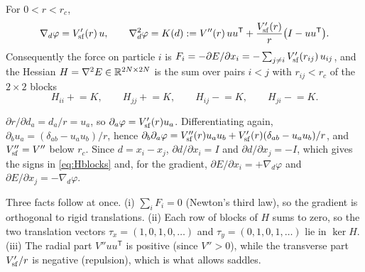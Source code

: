 \begin{proposition}\label{prop:grad-hess}
For $0<r<r_c$,
\begin{equation}\label{eq:pairgrad}
\nabla_d\varphi=V_{\rm sf}'(r)\,u,\qquad
\nabla_d^2\varphi=K(d):=V''(r)\,uu^{\mathsf T}+\frac{V_{\rm sf}'(r)}{r}\bigl(I-uu^{\mathsf T}\bigr).
\end{equation}
Consequently the force on particle $i$ is $F_i=-\partial E/\partial x_i=-\sum_{j\ne i}V_{\rm sf}'(r_{ij})\,u_{ij}$, and
the Hessian $H=\nabla^2E\in\mathbb{R}^{2N\times2N}$ is the sum over pairs $i<j$ with $r_{ij}<r_c$ of the $2\times2$ blocks
\begin{equation}\label{eq:Hblocks}
H_{ii}\mathrel{+}=K,\qquad H_{jj}\mathrel{+}=K,\qquad H_{ij}\mathrel{-}=K,\qquad H_{ji}\mathrel{-}=K .
\end{equation}
\end{proposition}
\begin{humanproof}
$\partial r/\partial d_a=d_a/r=u_a$, so $\partial_a\varphi=V_{\rm sf}'(r)u_a$. Differentiating again,
$\partial_bu_a=(\delta_{ab}-u_au_b)/r$, hence
$\partial_b\partial_a\varphi=V_{\rm sf}''(r)u_au_b+V_{\rm sf}'(r)(\delta_{ab}-u_au_b)/r$, and $V_{\rm sf}''=V''$ below
$r_c$. Since $d=x_i-x_j$, $\partial d/\partial x_i=I$ and $\partial d/\partial x_j=-I$, which gives the signs in
\eqref{eq:Hblocks} and, for the gradient, $\partial E/\partial x_i=+\nabla_d\varphi$ and $\partial E/\partial x_j=-\nabla_d\varphi$.
\end{humanproof}

Three facts follow at once. (i) $\sum_iF_i=0$ (Newton's third law), so the gradient is orthogonal to rigid
translations. (ii) Each row of blocks of $H$ sums to zero, so the two translation vectors
$\tau_x=(1,0,1,0,\dots)$ and $\tau_y=(0,1,0,1,\dots)$ lie in $\ker H$. (iii) The radial part $V''uu^{\mathsf T}$ is
positive (since $V''>0$), while the transverse part $V_{\rm sf}'/r$ is negative (repulsion), which is what allows
saddles.

